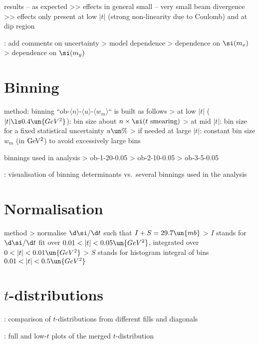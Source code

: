 \> results -- as expected
\>>> effects in general small -- very small beam divergence
\>>> effects only present at low $|t|$ (strong non-linearity due to Coulomb) and at dip region

\> \TODO: add comments on uncertainty
\>> model dependence
\>> dependence on $\si(m_x)$
\>> dependence on $\si(m_y)$


\section{Binning}

\> method: binning ``ob-$\langle n\rangle$-$\langle u\rangle$-$\langle w_m\rangle$`` is built as follows
\>> at low $|t|$ ($|t| \ls 0.4\un{GeV^2}$): bin size about $n\times \si(\hbox{$t$ smearing})$
\>> at mid $|t|$: bin size for a fixed statistical uncertainty $u\un{\%}$
\>> if needed at large $|t|$: constant bin size $w_m$ (in $\rm GeV^2$) to avoid excessively large bins

\> binnings used in analysis
\>> ob-1-20-0.05
\>> ob-2-10-0.05
\>> ob-3-5-0.05

\>  : visualisation of binning determinants vs.~several binnings used in
the analysis



\section{Normalisation}

\> method
\>> normalise $\d\si/\d t$ such that $I + S = 29.7\un{mb}$
\>> $I$ stands for $\d\si/\d t$ fit over $0.01 < |t| < 0.05\un{GeV^2}$, integrated over $0 < |t| < 0.01\un{GeV^2}$
\>> $S$ stands for histogram integral of bins $0.01 < |t| < 0.5\un{GeV^2}$


\section{$t$-distributions}

\> : comparison of $t$-distributions from different fills and diagonals

\> : full and low-$t$ plots of the merged $t$-distribution

